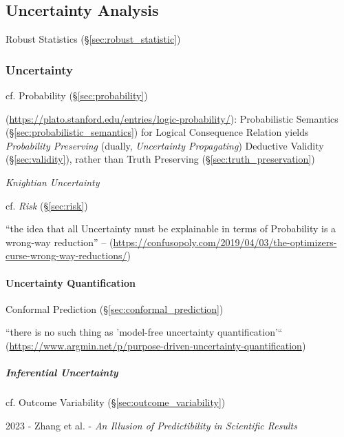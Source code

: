 \subsection{Uncertainty Analysis}\label{sec:uncertainty_analysis}

\fist Robust Statistics (\S\ref{sec:robust_statistic})



\subsubsection{Uncertainty}\label{sec:uncertainty}

cf. Probability (\S\ref{sec:probability})

(\url{https://plato.stanford.edu/entries/logic-probability/}): Probabilistic
Semantics (\S\ref{sec:probabilistic_semantics}) for Logical Consequence Relation
yields \emph{Probability Preserving} (dually, \emph{Uncertainty Propagating})
Deductive Validity (\S\ref{sec:validity}), rather than Truth Preserving
(\S\ref{sec:truth_preservation})

\emph{Knightian Uncertainty}

cf. \emph{Risk} (\S\ref{sec:risk})

``the idea that all Uncertainty must be explainable in terms of Probability is a
wrong-way reduction'' --
(\url{https://confusopoly.com/2019/04/03/the-optimizers-curse-wrong-way-reductions/})



\paragraph{Uncertainty Quantification}
\label{sec:uncertainty_quantification}\hfill

Conformal Prediction (\S\ref{sec:conformal_prediction})

``there is no such thing as 'model-free uncertainty quantification'``
(\url{https://www.argmin.net/p/purpose-driven-uncertainty-quantification})



\subparagraph{Inferential Uncertainty}\label{sec:inferential_uncertainty}\hfill

cf. Outcome Variability (\S\ref{sec:outcome_variability})

2023 - Zhang et al. - \emph{An Illusion of Predictibility in Scientific Results}



